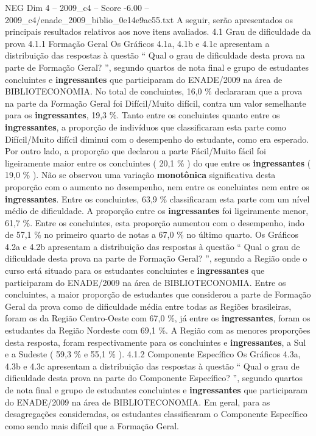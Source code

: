 \begin{textsample}{NEG Dim 4 – 2009\_c4 – Score -6.00 – 2009\_c4/enade\_2009\_biblio\_0e14e9ac55.txt}
A seguir, serão apresentados os principais resultados relativos aos nove itens avaliados. 4.1 Grau de dificuldade da prova 4.1.1 Formação Geral Os Gráficos 4.1a, 4.1b e 4.1c apresentam a distribuição das respostas à questão “ Qual o grau de dificuldade desta prova na parte de Formação Geral? ”, segundo quartos de nota final e grupo de estudantes concluintes e \textbf{ingressantes} que participaram do ENADE/2009 na área de BIBLIOTECONOMIA.
No total de concluintes, 16,0 \% declararam que a prova na parte da Formação Geral foi Difícil/Muito difícil, contra um valor semelhante para os \textbf{ingressantes}, 19,3 \%.
Tanto entre os concluintes quanto entre os \textbf{ingressantes}, a proporção de indivíduos que classificaram esta parte como Difícil/Muito difícil diminui com o desempenho do estudante, como era esperado.
Por outro lado, a proporção que declarou a parte Fácil/Muito fácil foi ligeiramente maior entre os concluintes ( 20,1 \% ) do que entre os \textbf{ingressantes} ( 19,0 \% ).
Não se observou uma variação \textbf{monotônica} significativa desta proporção com o aumento no desempenho, nem entre os concluintes nem entre os \textbf{ingressantes}.
Entre os concluintes, 63,9 \% classificaram esta parte com um nível médio de dificuldade.
A proporção entre os \textbf{ingressantes} foi ligeiramente menor, 61,7 \%.
Entre os concluintes, esta proporção aumentou com o desempenho, indo de 57,1 \% no primeiro quarto de notas a 67,0 \% no último quarto.
Os Gráficos 4.2a e 4.2b apresentam a distribuição das respostas à questão “ Qual o grau de dificuldade desta prova na parte de Formação Geral? ”, segundo a Região onde o curso está situado para os estudantes concluintes e \textbf{ingressantes} que participaram do ENADE/2009 na área de BIBLIOTECONOMIA.
Entre os concluintes, a maior proporção de estudantes que considerou a parte de Formação Geral da prova como de dificuldade média entre todas as Regiões brasileiras, foram os da Região Centro-Oeste com 67,0 \%, já entre os \textbf{ingressantes}, foram os estudantes da Região Nordeste com 69,1 \%.
A Região com as menores proporções desta resposta, foram respectivamente para os concluintes e \textbf{ingressantes}, a Sul e a Sudeste ( 59,3 \% e 55,1 \% ). 4.1.2 Componente Específico Os Gráficos 4.3a, 4.3b e 4.3c apresentam a distribuição das respostas à questão “ Qual o grau de dificuldade desta prova na parte do Componente Específico? ”, segundo quartos de nota final e grupo de estudantes concluintes e \textbf{ingressantes} que participaram do ENADE/2009 na área de BIBLIOTECONOMIA.
Em geral, para as desagregações consideradas, os estudantes classificaram o Componente Específico como sendo mais difícil que a Formação Geral.

\end{textsample}
